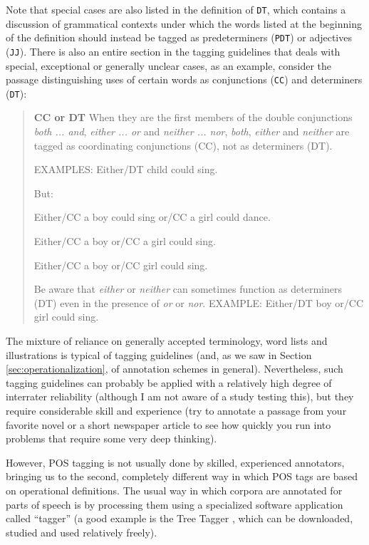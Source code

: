 Note that special cases are also listed in the definition of \texttt{DT}, which contains a discussion of grammatical contexts under which the words listed at the beginning of the definition should instead be tagged as predeterminers (\texttt{PDT}) or adjectives (\texttt{JJ}). There is also an entire section in the tagging guidelines that deals with special, exceptional or generally unclear cases, as an example, consider the passage distinguishing uses of certain words as conjunctions (\texttt{CC}) and determiners (\texttt{DT}):

\begin{quote}
\textbf{CC or DT}
When they are the first members of the double conjunctions \textit{both ... and}, \textit{either ... or} and \textit{neither ... nor}, \textit{both}, \textit{either} and \textit{neither} are tagged as coordinating conjunctions (CC), not as determiners (DT).

EXAMPLES: Either/DT child could sing. 

But:

Either/CC a boy could sing or/CC a girl could dance.

Either/CC a boy or/CC a girl could sing.

Either/CC a boy or/CC girl could sing.

Be aware that \textit{either} or \textit{neither} can sometimes function as determiners (DT) even in the presence of \textit{or} or \textit{nor}.
EXAMPLE: Either/DT boy or/CC girl could sing. \citep[7]{santorini_part--speech_1990}
\end{quote}

The mixture of reliance on generally accepted terminology, word lists and illustrations is typical of tagging guidelines (and, as we saw in Section \ref{sec:operationalization}, of annotation schemes in general). Nevertheless, such tagging guidelines can probably be applied with a relatively high degree of interrater reliability (although I am not aware of a study testing this), but they require considerable skill and experience (try to annotate a passage from your favorite novel or a short newspaper article to see how quickly you run into problems that require some very deep thinking).

However, POS tagging is not usually done by skilled, experienced annotators, bringing us to the second, completely different way in which POS tags are based on operational definitions. The usual way in which corpora are annotated for parts of speech is by processing them using a specialized software application called ``tagger'' (a good example is the Tree Tagger \citep{schmid_probabilistic_1994}, which can be downloaded, studied and used relatively freely).

